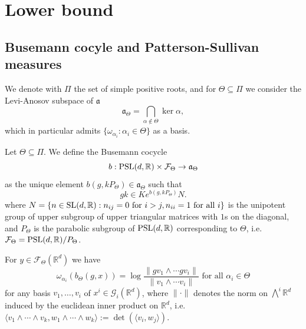 \documentclass{report}
\begin{document}
\chapter{Lower bound}\label{ch:lower_bound}
\section{Busemann cocyle and Patterson-Sullivan measures}
We denote with $\Pi$ the set of simple positive roots, and for $\Theta \subseteq \Pi$ we consider the Levi-Anosov subspace of $\mathfrak a$
\[
    \mathfrak a_\Theta = \bigcap_{\alpha \notin \Theta} \ker \alpha,
\]
which in particular admits $\{ \omega_{\alpha_i} : \alpha_i \in \Theta \}$ as a basis.
\begin{definition}
    Let $\Theta \subseteq \Pi$. We define the Busemann cocycle
    \[
    b : \operatorname{{\mathrm{PSL}}}(d, \mathbb R) \times \mathcal F_\Theta \to \mathfrak a_\Theta
    \]
    as the unique element $b(g, k P_\Theta) \in \mathfrak a_\Theta$ such that
    \[
    g k \in K e^{b(g, k P_\Theta)} N.
    \]
    where $N = \{ n \in \operatorname{{\mathrm{SL}}}(d, \mathbb R) : n_{ij} = 0 \text{ for } i > j, n_{ii} = 1 \text{ for all } i \}$ is the unipotent group of upper subgroup of upper triangular matrices with $1$s on the diagonal, and $P_\Theta$ is the parabolic subgroup of $\operatorname{{\mathrm{PSL}}}(d, \mathbb R)$ corresponding to $\Theta$, i.e.\ $\mathcal F_\Theta = \operatorname{{\mathrm{PSL}}}(d, \mathbb R)/P_\Theta$.
\end{definition}
\begin{lemma}
For $y \in \mathcal F_\Theta(\mathbb R^d)$ we have    
\[
    \omega_{\alpha_i}(b_\Theta(g, x)) =
    \log \frac{\| g v_1 \wedge \cdots g v_i \|}{ \| v_1 \wedge \cdots v_i \| }
    \text{ for all } \alpha_i \in \Theta
\]
for any basis $v_1, \ldots, v_i$ of $x^i \in \mathcal G_i(\mathbb R^d)$, where $\| \cdot \|$ denotes the norm on $\bigwedge^i \mathbb R^d$ induced by the euclidean inner product on $\mathbb R^d$, 
i.e.\ $ \langle v_1 \wedge \cdots \wedge v_k, w_1 \wedge \cdots \wedge w_k \rangle := \det(\langle v_i, w_j \rangle)$.
\end{lemma}
\end{document}
